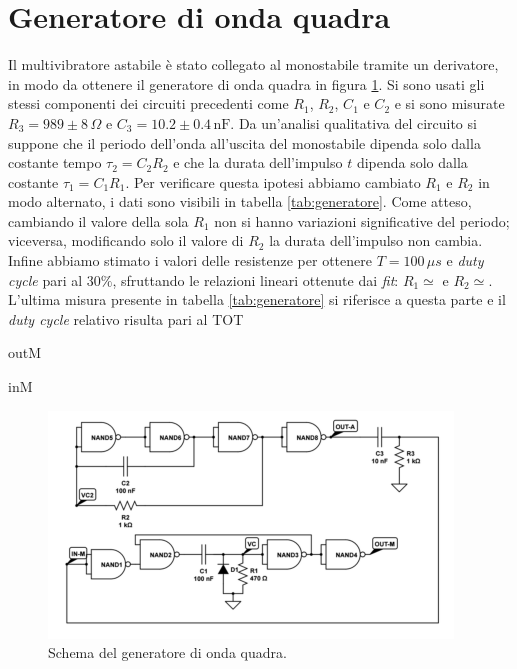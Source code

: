 \documentclass[10pt,a4paper]{article}
\begin{document}
\section{Generatore di onda quadra}
Il multivibratore astabile è stato collegato al monostabile tramite un derivatore, in modo da ottenere il generatore di onda quadra in figura \ref{fig:generatorequadra}. Si sono usati gli stessi componenti dei circuiti precedenti come $R_1$, $R_2$, $C_1$ e $C_2$ e si sono misurate $R_3=989\pm8\,\Omega$ e $C_3= 10.2\pm0.4 \,\text{nF}$. Da un'analisi qualitativa del circuito si suppone che il periodo dell'onda all'uscita del monostabile dipenda solo dalla costante tempo $\tau_2=C_2R_2$ e che la durata dell'impulso $t$ dipenda solo dalla costante $\tau_1=C_1R_1$. Per verificare questa ipotesi abbiamo cambiato $R_1$ e $R_2$ in modo alternato, i dati sono visibili in tabella \ref{tab:generatore}. Come atteso, cambiando il valore della sola $R_1$ non si hanno variazioni significative del periodo; viceversa, modificando solo il valore di $R_2$ la durata dell'impulso non cambia.
Infine abbiamo stimato i valori delle resistenze per ottenere $T=100\,\mu s$ e \emph{duty cycle} pari al $30\%$, sfruttando le relazioni lineari ottenute dai \emph{fit}: $R_1\simeq $ e $R_2 \simeq $. L'ultima misura presente in tabella \ref{tab:generatore} si riferisce a questa parte e il \emph{duty cycle} relativo risulta pari al TOT



outM

inM





\begin{figure}[!htb]
  \centering
  \includegraphics[scale=0.5]{generatorequadra.png}
\caption{Schema del generatore di onda quadra.\label{fig:generatorequadra}}
\end{figure}
\end{document}
